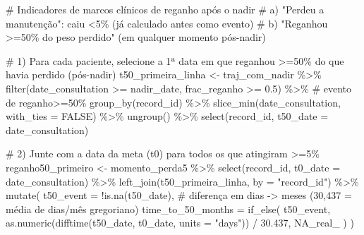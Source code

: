 \documentclass[
]{article}
\newenvironment{Shaded}{\begin{snugshade}}{\end{snugshade}}
\newcommand{\AttributeTok}[1]{\textcolor[rgb]{0.40,0.45,0.13}{#1}}
\newcommand{\CommentTok}[1]{\textcolor[rgb]{0.37,0.37,0.37}{#1}}
\newcommand{\ConstantTok}[1]{\textcolor[rgb]{0.56,0.35,0.01}{#1}}
\newcommand{\FloatTok}[1]{\textcolor[rgb]{0.68,0.00,0.00}{#1}}
\newcommand{\FunctionTok}[1]{\textcolor[rgb]{0.28,0.35,0.67}{#1}}
\newcommand{\NormalTok}[1]{\textcolor[rgb]{0.00,0.23,0.31}{#1}}
\newcommand{\OtherTok}[1]{\textcolor[rgb]{0.00,0.23,0.31}{#1}}
\newcommand{\SpecialCharTok}[1]{\textcolor[rgb]{0.37,0.37,0.37}{#1}}
\newcommand{\StringTok}[1]{\textcolor[rgb]{0.13,0.47,0.30}{#1}}
\begin{document}
\begin{Shaded}
\begin{Highlighting}[]
\CommentTok{\# Indicadores de marcos clínicos de reganho após o nadir}
\CommentTok{\#  a) "Perdeu a manutenção": caiu \textless{}5\% (já calculado antes como evento)}
\CommentTok{\#  b) "Reganhou \textgreater{}=50\% do peso perdido" (em qualquer momento pós{-}nadir)}

\CommentTok{\# 1) Para cada paciente, selecione a 1ª data em que reganhou \textgreater{}=50\% do que havia perdido (pós{-}nadir)}
\NormalTok{t50\_primeira\_linha }\OtherTok{\textless{}{-}}\NormalTok{ traj\_com\_nadir }\SpecialCharTok{\%\textgreater{}\%}
  \FunctionTok{filter}\NormalTok{(date\_consultation }\SpecialCharTok{\textgreater{}=}\NormalTok{ nadir\_date, frac\_reganho }\SpecialCharTok{\textgreater{}=} \FloatTok{0.5}\NormalTok{) }\SpecialCharTok{\%\textgreater{}\%}     \CommentTok{\# evento de reganho\textgreater{}=50\%}
  \FunctionTok{group\_by}\NormalTok{(record\_id) }\SpecialCharTok{\%\textgreater{}\%}
  \FunctionTok{slice\_min}\NormalTok{(date\_consultation, }\AttributeTok{with\_ties =} \ConstantTok{FALSE}\NormalTok{) }\SpecialCharTok{\%\textgreater{}\%}
  \FunctionTok{ungroup}\NormalTok{() }\SpecialCharTok{\%\textgreater{}\%}
  \FunctionTok{select}\NormalTok{(record\_id, }\AttributeTok{t50\_date =}\NormalTok{ date\_consultation)}

\CommentTok{\# 2) Junte com a data da meta (t0) para todos os que atingiram \textgreater{}=5\%}
\NormalTok{reganho50\_primeiro }\OtherTok{\textless{}{-}}\NormalTok{ momento\_perda5 }\SpecialCharTok{\%\textgreater{}\%}
  \FunctionTok{select}\NormalTok{(record\_id, }\AttributeTok{t0\_date =}\NormalTok{ date\_consultation) }\SpecialCharTok{\%\textgreater{}\%}
  \FunctionTok{left\_join}\NormalTok{(t50\_primeira\_linha, }\AttributeTok{by =} \StringTok{"record\_id"}\NormalTok{) }\SpecialCharTok{\%\textgreater{}\%}
  \FunctionTok{mutate}\NormalTok{(}
    \AttributeTok{t50\_event =} \SpecialCharTok{!}\FunctionTok{is.na}\NormalTok{(t50\_date),}
    \CommentTok{\# diferença em dias {-}\textgreater{} meses (30,437 = média de dias/mês gregoriano)}
    \AttributeTok{time\_to\_50\_months =} \FunctionTok{if\_else}\NormalTok{(}
\NormalTok{      t50\_event,}
      \FunctionTok{as.numeric}\NormalTok{(}\FunctionTok{difftime}\NormalTok{(t50\_date, t0\_date, }\AttributeTok{units =} \StringTok{"days"}\NormalTok{)) }\SpecialCharTok{/} \FloatTok{30.437}\NormalTok{,}
      \ConstantTok{NA\_real\_}
\NormalTok{    )}
\NormalTok{  )}


\end{Highlighting}
\end{Shaded}
\end{document}
